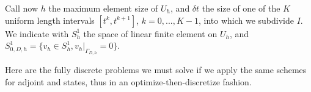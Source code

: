 \documentclass[english,a4paper,9pt,oneside]{scrbook}	%
\theoremstyle{break}
\theoremstyle{remark}
\begin{document}
%



Call now $h$ the maximum element size of $U_h$, and $\delta t$ the size of one of the $K$ uniform length intervals $[t^k,t^{k+1}]$, $k=0,...,K-1$, into which we subdivide $I$.
We indicate with $S^1_h$ the space of linear finite element on $U_h$, and  $S^1_{0,D,h}=\{ v_h \in S^1_h, {v_h}|_{\Gamma_{D,h}}=0\}$.

Here are the fully discrete problems we must solve if we apply the same schemes for adjoint and states, thus in an optimize-then-discretize fashion.
\end{document}
